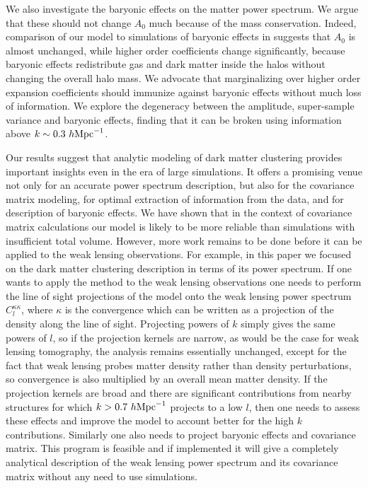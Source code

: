 \documentclass[
  11pt,
  twoside,
  openright,
  titlepage,
  headings=optiontoheadandtoc
]{scrbook}
\begin{document}
We also investigate the baryonic effects on the matter power spectrum. We argue that these 
should not change $A_0$ much because of the mass conservation. Indeed, comparison of our model to 
simulations of baryonic effects in \cite{2011MNRAS.415.3649V} suggests that $A_0$ is almost unchanged, while higher order 
coefficients change significantly, because baryonic effects redistribute gas and dark matter 
inside the halos without changing the overall halo mass. 
We advocate that marginalizing over higher order expansion coefficients 
should immunize against baryonic effects without much loss of information. We explore the degeneracy 
between the amplitude, super-sample variance and baryonic effects, finding that it can be broken using 
information above $k \sim 0.3\ h \rm{Mpc}^{-1}$. 

Our results suggest that analytic modeling of dark matter clustering provides important insights 
even in the era of large simulations. 
It offers a promising 
venue not only for an accurate power spectrum description, but also for the covariance matrix modeling, 
for optimal extraction of information from the data, and for description of baryonic effects. 
We have shown that in the context of covariance matrix calculations our model is likely to be more reliable 
than simulations with insufficient total volume. 
However, more work remains to be done before it can be applied to the weak lensing observations. 
For example, 
in this paper we focused on the dark matter clustering description in terms of its
power spectrum. If one wants to apply the method
to the weak lensing observations one needs to perform the line of sight projections of the model onto the weak
lensing power spectrum $C^{\kappa \kappa}_{l}$, where $\kappa$ is the convergence which can be 
written as a projection of the density along the line of sight. Projecting powers of $k$ simply gives the same 
powers of $l$, so if the projection kernels are narrow, as would be the case for weak lensing 
tomography, the analysis remains essentially 
unchanged, except for the fact that weak lensing probes matter density rather than density 
perturbations, so convergence is also multiplied by an overall mean 
matter density. If the projection kernels are broad and there are significant 
contributions from nearby structures for which $k>0.7\ h \rm{Mpc}^{-1}$ projects to a low $l$, then one
needs to assess these effects and improve the model to account better for the high $k$ contributions. 
Similarly one also needs to project baryonic effects and covariance matrix. 
This program is feasible and if implemented it will give a completely analytical 
description of the weak lensing power spectrum and its covariance matrix
without any need to use simulations. 
\end{document}

